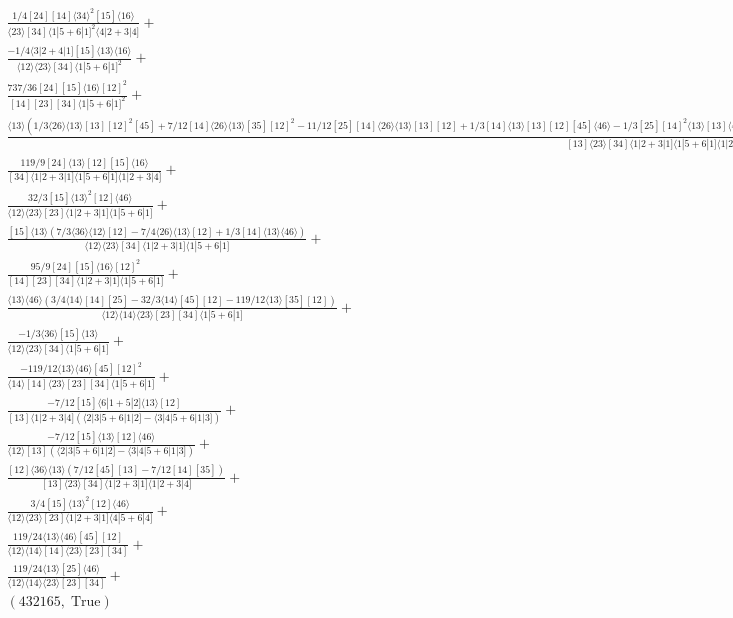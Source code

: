 \documentclass[varwidth, border=5pt]{standalone}
\begin{document}
\begin{my}
$\begin{gathered}
\scriptscriptstyle\frac{1/4[24][14]⟨34⟩^2[15]⟨16⟩}{⟨23⟩[34]⟨1|5+6|1]^2⟨4|2+3|4]}+\\
\scriptscriptstyle\frac{-1/4⟨3|2+4|1][15]⟨13⟩⟨16⟩}{⟨12⟩⟨23⟩[34]⟨1|5+6|1]^2}+\\
\scriptscriptstyle\frac{737/36[24][15]⟨16⟩[12]^2}{[14][23][34]⟨1|5+6|1]^2}+\\
\scriptscriptstyle\frac{⟨13⟩(1/3⟨26⟩⟨13⟩[13][12]^2[45]+7/12[14]⟨26⟩⟨13⟩[35][12]^2-11/12[25][14]⟨26⟩⟨13⟩[13][12]+1/3[14]⟨13⟩[13][12][45]⟨46⟩-1/3[25][14]^2⟨13⟩[13]⟨46⟩+1/3⟨13⟩[13]^2[12]⟨36⟩[45]-1/3[25][14]⟨13⟩[13]^2⟨36⟩-7/12⟨14⟩[14][13][12]⟨36⟩[45]+7/12⟨14⟩[14]^2[35][12]⟨36⟩)}{[13]⟨23⟩[34]⟨1|2+3|1]⟨1|5+6|1]⟨1|2+3|4]}+\\
\scriptscriptstyle\frac{119/9[24]⟨13⟩[12][15]⟨16⟩}{[34]⟨1|2+3|1]⟨1|5+6|1]⟨1|2+3|4]}+\\
\scriptscriptstyle\frac{32/3[15]⟨13⟩^2[12]⟨46⟩}{⟨12⟩⟨23⟩[23]⟨1|2+3|1]⟨1|5+6|1]}+\\
\scriptscriptstyle\frac{[15]⟨13⟩(7/3⟨36⟩⟨12⟩[12]-7/4⟨26⟩⟨13⟩[12]+1/3[14]⟨13⟩⟨46⟩)}{⟨12⟩⟨23⟩[34]⟨1|2+3|1]⟨1|5+6|1]}+\\
\scriptscriptstyle\frac{95/9[24][15]⟨16⟩[12]^2}{[14][23][34]⟨1|2+3|1]⟨1|5+6|1]}+\\
\scriptscriptstyle\frac{⟨13⟩⟨46⟩(3/4⟨14⟩[14][25]-32/3⟨14⟩[45][12]-119/12⟨13⟩[35][12])}{⟨12⟩⟨14⟩⟨23⟩[23][34]⟨1|5+6|1]}+\\
\scriptscriptstyle\frac{-1/3⟨36⟩[15]⟨13⟩}{⟨12⟩⟨23⟩[34]⟨1|5+6|1]}+\\
\scriptscriptstyle\frac{-119/12⟨13⟩⟨46⟩[45][12]^2}{⟨14⟩[14]⟨23⟩[23][34]⟨1|5+6|1]}+\\
\scriptscriptstyle\frac{-7/12[15]⟨6|1+5|2]⟨13⟩[12]}{[13]⟨1|2+3|4](⟨2|3|5+6|1|2]-⟨3|4|5+6|1|3])}+\\
\scriptscriptstyle\frac{-7/12[15]⟨13⟩[12]⟨46⟩}{⟨12⟩[13](⟨2|3|5+6|1|2]-⟨3|4|5+6|1|3])}+\\
\scriptscriptstyle\frac{[12]⟨36⟩⟨13⟩(7/12[45][13]-7/12[14][35])}{[13]⟨23⟩[34]⟨1|2+3|1]⟨1|2+3|4]}+\\
\scriptscriptstyle\frac{3/4[15]⟨13⟩^2[12]⟨46⟩}{⟨12⟩⟨23⟩[23]⟨1|2+3|1]⟨4|5+6|4]}+\\
\scriptscriptstyle\frac{119/24⟨13⟩⟨46⟩[45][12]}{⟨12⟩⟨14⟩[14]⟨23⟩[23][34]}+\\
\scriptscriptstyle\frac{119/24⟨13⟩[25]⟨46⟩}{⟨12⟩⟨14⟩⟨23⟩[23][34]}+\\
\scriptscriptstyle(432165,\;\text{True})\phantom{+}
\end{gathered}$
\end{my}
\end{document}
